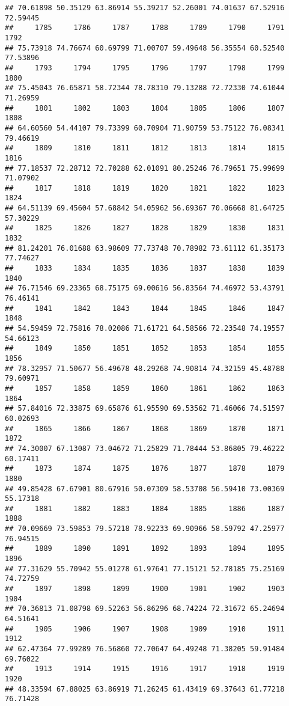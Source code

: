 \documentclass[
]{article}
\begin{document}
\begin{verbatim}
## 70.61898 50.35129 63.86914 55.39217 52.26001 74.01637 67.52916 72.59445 
##     1785     1786     1787     1788     1789     1790     1791     1792 
## 75.73918 74.76674 60.69799 71.00707 59.49648 56.35554 60.52540 77.53896 
##     1793     1794     1795     1796     1797     1798     1799     1800 
## 75.45043 76.65871 58.72344 78.78310 79.13288 72.72330 74.61044 71.26959 
##     1801     1802     1803     1804     1805     1806     1807     1808 
## 64.60560 54.44107 79.73399 60.70904 71.90759 53.75122 76.08341 79.46619 
##     1809     1810     1811     1812     1813     1814     1815     1816 
## 77.18537 72.28712 72.70288 62.01091 80.25246 76.79651 75.99699 71.07902 
##     1817     1818     1819     1820     1821     1822     1823     1824 
## 64.51139 69.45604 57.68842 54.05962 56.69367 70.06668 81.64725 57.30229 
##     1825     1826     1827     1828     1829     1830     1831     1832 
## 81.24201 76.01688 63.98609 77.73748 70.78982 73.61112 61.35173 77.74627 
##     1833     1834     1835     1836     1837     1838     1839     1840 
## 76.71546 69.23365 68.75175 69.00616 56.83564 74.46972 53.43791 76.46141 
##     1841     1842     1843     1844     1845     1846     1847     1848 
## 54.59459 72.75816 78.02086 71.61721 64.58566 72.23548 74.19557 54.66123 
##     1849     1850     1851     1852     1853     1854     1855     1856 
## 78.32957 71.50677 56.49678 48.29268 74.90814 74.32159 45.48788 79.60971 
##     1857     1858     1859     1860     1861     1862     1863     1864 
## 57.84016 72.33875 69.65876 61.95590 69.53562 71.46066 74.51597 60.02693 
##     1865     1866     1867     1868     1869     1870     1871     1872 
## 74.30007 67.13087 73.04672 71.25829 71.78444 53.86805 79.46222 60.17411 
##     1873     1874     1875     1876     1877     1878     1879     1880 
## 49.85428 67.67901 80.67916 50.07309 58.53708 56.59410 73.00369 55.17318 
##     1881     1882     1883     1884     1885     1886     1887     1888 
## 70.09669 73.59853 79.57218 78.92233 69.90966 58.59792 47.25977 76.94515 
##     1889     1890     1891     1892     1893     1894     1895     1896 
## 77.31629 55.70942 55.01278 61.97641 77.15121 52.78185 75.25169 74.72759 
##     1897     1898     1899     1900     1901     1902     1903     1904 
## 70.36813 71.08798 69.52263 56.86296 68.74224 72.31672 65.24694 64.51641 
##     1905     1906     1907     1908     1909     1910     1911     1912 
## 62.47364 77.99289 76.56860 72.70647 64.49248 71.38205 59.91484 69.76022 
##     1913     1914     1915     1916     1917     1918     1919     1920 
## 48.33594 67.88025 63.86919 71.26245 61.43419 69.37643 61.77218 76.71428 

\end{verbatim}
\end{document}
